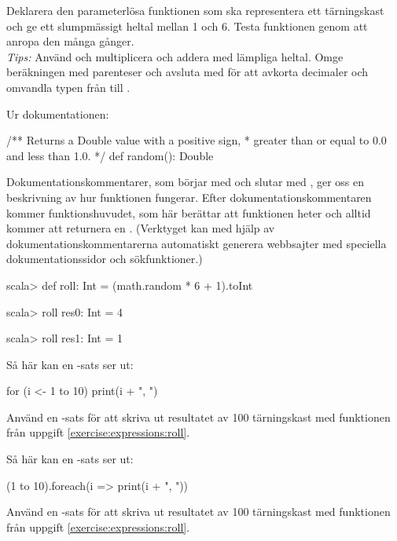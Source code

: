 \Subtask Deklarera den parameterlösa funktionen  som ska representera ett tärningskast och ge ett slumpmässigt heltal mellan 1 och 6. Testa funktionen genom att anropa den många gånger. \\\emph{Tips:} Använd  och multiplicera och addera med lämpliga heltal. Omge beräkningen med parenteser och avsluta med  för att avkorta decimaler och omvandla typen från  till .

\SOLUTION

\TaskSolved \what

\SubtaskSolved Ur dokumentationen:
\begin{Code}
/** Returns a Double value with a positive sign,
 *  greater than or equal to 0.0 and less than 1.0.
 */
def random(): Double
\end{Code}
Dokumentationskommentarer, som börjar med \code{/**} och slutar med \code{*/}, ger oss en beskrivning av hur funktionen fungerar. Efter dokumentationskommentaren kommer funktionshuvudet, som här berättar att funktionen heter  och alltid kommer att returnera en . (Verktyget  kan med hjälp av  dokumentationskommentarerna automatiskt generera webbsajter med speciella  dokumentationssidor och sökfunktioner.)

\SubtaskSolved
\begin{REPL}
scala> def roll: Int = (math.random * 6 + 1).toInt

scala> roll
res0: Int = 4

scala> roll
res1: Int = 1
\end{REPL}

\QUESTEND





\QUESTBEGIN

\Task \what

\Subtask Så här kan en -sats ser ut:
\begin{Code}
for (i <- 1 to 10) print(i + ", ")
\end{Code}
Använd en -sats för att skriva ut resultatet av 100 tärningskast med funktionen  från uppgift \ref{exercise:expressions:roll}.

\Subtask Så här kan en -sats ser ut:
\begin{Code}
(1 to 10).foreach(i => print(i + ", "))
\end{Code}
Använd en -sats för att skriva ut resultatet av 100 tärningskast med funktionen  från uppgift \ref{exercise:expressions:roll}.

